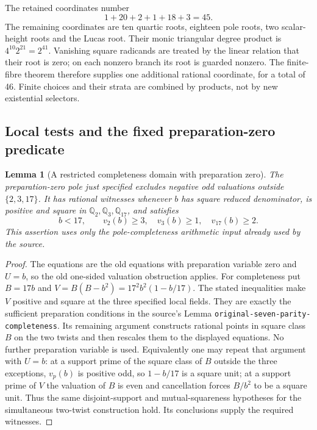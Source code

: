 \documentclass[11pt]{article}
\newtheorem{lemma}[theorem]{Lemma}
\theoremstyle{definition}
\begin{document}
The retained coordinates number
\[
 1+20+2+1+18+3=45.
\]
The remaining coordinates are ten quartic roots, eighteen pole roots,
two scalar-height roots and the Lucas root. Their monic triangular
degree product is $4^{10}2^{21}=2^{41}$. Vanishing square radicands
are treated by the linear relation that their root is zero; on each
nonzero branch its root is guarded nonzero. The finite-fibre theorem
therefore supplies one additional rational coordinate, for a total of
46. Finite choices and their strata are combined by products, not by
new existential selectors.

\subsection{Local tests and the fixed preparation-zero predicate}

\begin{lemma}[A restricted completeness domain with preparation zero]
The preparation-zero pole just specified excludes negative odd
valuations outside $\{2,3,17\}$. It has rational witnesses whenever
$b$ has square reduced denominator, is positive and square in
$\mathbb Q_2,\mathbb Q_3,\mathbb Q_{17}$, and satisfies
\[
 b<17,\qquad v_2(b)\ge3,\quad v_3(b)\ge1,\quad v_{17}(b)\ge2.
\]
This assertion uses only the pole-completeness arithmetic input already
used by the source.
\end{lemma}
\begin{proof}
The equations are the old equations with preparation variable zero and
$U=b$, so the old one-sided valuation obstruction applies. For
completeness put $B=17b$ and $V=B(B-b^2)=17^2b^2(1-b/17)$.
The stated inequalities make $V$ positive and square at the three
specified local fields. They are exactly the sufficient preparation
conditions in the source's Lemma
\texttt{original-seven-parity-completeness}. Its remaining argument
constructs rational points in square class $B$ on the two twists and
then rescales them to the displayed equations. No further preparation
variable is used. Equivalently one may repeat that argument with
$U=b$: at a support prime of the square class of $B$ outside the three
exceptions, $v_p(b)$ is positive odd, so $1-b/17$ is a square unit;
at a support prime of $V$ the valuation of $B$ is even and cancellation
forces $B/b^2$ to be a square unit. Thus the same disjoint-support and
mutual-squareness hypotheses for the simultaneous two-twist construction
hold. Its conclusions supply the required witnesses.
\end{proof}
\end{document}

